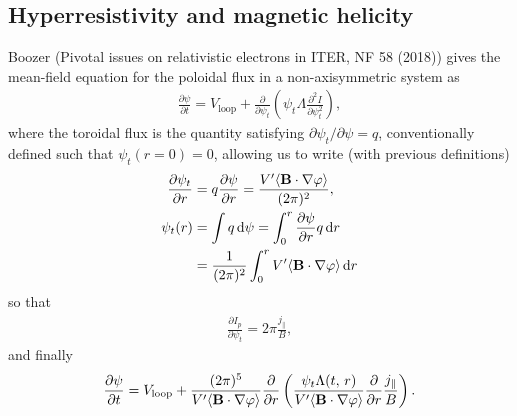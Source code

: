 \documentclass[11pt,a4paper]{article}
\newcommand{\rd}{\ensuremath{\mathrm{d}}}
\newcommand{\sub}[1]{\ensuremath{_{\text{#1}}}}
\renewcommand{\b}[1]{\ensuremath{ {\bf #1 } }}
\begin{document}

\subsection{Hyperresistivity and magnetic helicity}
Boozer (Pivotal issues on relativistic electrons in ITER, NF 58 (2018)) gives the mean-field equation for the poloidal flux in a non-axisymmetric system as
\begin{align}
\frac{\partial \psi}{\partial t} = V\sub{loop} + \frac{\partial}{\partial \psi_t}\left(\psi_t \Lambda \frac{\partial^2 I}{\partial \psi_t^2}\right),
\end{align}
where the toroidal flux is the quantity satisfying $\partial \psi_t/\partial \psi = q$, conventionally defined such that $\psi_t(r=0) = 0$, allowing us to write (with previous definitions) 
\begin{align}
\frac{\partial \psi_t}{\partial r} &= q\frac{\partial \psi}{\partial r} = \frac{V'\langle \b{B}\cdot\nabla\varphi \rangle}{(2\pi)^2}, \nonumber \\
\psi_t(r) &= \int q \,\rd \psi = \int_0^r \frac{\partial \psi}{\partial r}q\,\rd r \nonumber \\
&= \frac{1}{(2\pi)^2} \int_0^r V'\langle \b{B}\cdot\nabla\varphi\rangle\,\rd r
\end{align}
so that
\begin{align}
\frac{\partial I_p}{\partial \psi_t} = 2\pi \frac{j_\parallel}{B},
\end{align}
and finally 
\begin{align}
\frac{\partial \psi}{\partial t} = V\sub{loop} + \frac{(2\pi)^5}{ V'\langle \b{B}\cdot\nabla\varphi\rangle}\frac{\partial}{\partial r}\left( \frac{\psi_t\Lambda(t,\,r)}{V'\langle \b{B}\cdot\nabla\varphi\rangle}  \frac{\partial}{\partial r}\frac{j_\parallel}{B}\right).
\end{align}
\end{document}
